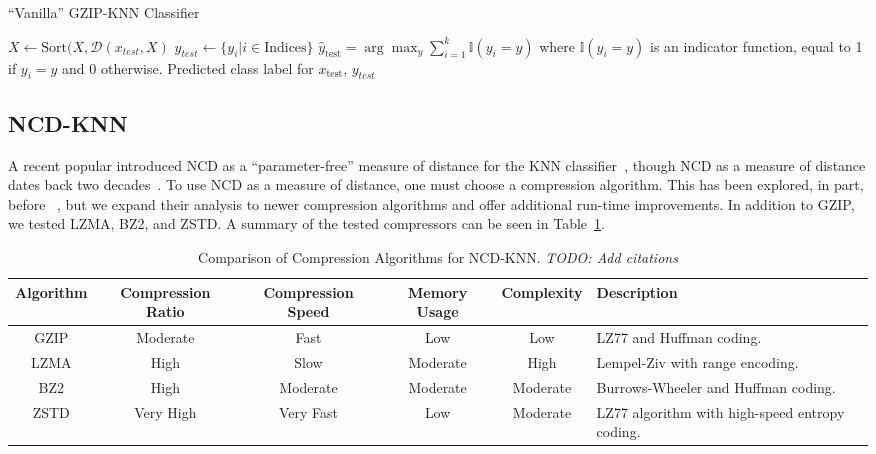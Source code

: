\documentclass[conference]{IEEEtran}
\newcommand{\cm}[1]{\textit{{\color{blue}#1}}}
\begin{document}
\begin{algorithm}
    \caption{``Vanilla'' GZIP-KNN Classifier}
    \label{alg:knn}
    \label{alg:vanilla}
    \begin{algorithmic}
    \State $ X \leftarrow \textrm{Sort}(X, \mathcal{D}(x_{test}, X)
    $
    \State $y_{test} \leftarrow \{y_i | i \in \textrm{Indices}\}$
    \State $\hat{y}_{\text{test}} = \arg\max_y \sum_{i=1}^{k} \mathbb{I}(y_i = y)$
    where $\mathbb{I}(y_i = y)$ is an indicator function, equal to 1 if $y_i = y$ and 0 otherwise.
    \State \Return Predicted class label for $x_{\text{test}}$, $y_{test}$
    
    \end{algorithmic}
    
\end{algorithm}


\subsection{NCD-KNN}
\label{ncd-knn}

A recent popular introduced NCD as a ``parameter-free'' measure of distance for the KNN classifier~\cite{jiang2022less}, though NCD as a measure of distance dates back two decades~\cite{ncd}. 
To use NCD as a measure of distance, one must choose a compression algorithm. This has been explored, in part, before ~\cite{ncd_pitfalls}, but we expand their analysis to newer compression algorithms and offer additional run-time improvements.
In addition to GZIP, we tested LZMA, BZ2, and ZSTD. A summary of the tested compressors can be seen in Table~\ref{tab:compression_algorithms}.

\begin{table}[h]
    \centering
    \caption{Comparison of Compression Algorithms for NCD-KNN. \cm{TODO: Add citations}}
    \begin{tabular}{|c|c|c|c|c|l|}
        \hline
        \textbf{Algorithm} & \textbf{Compression Ratio} & \textbf{Compression Speed} & \textbf{Memory Usage} & \textbf{Complexity} & \textbf{Description} \\ \hline
        GZIP  & Moderate & Fast & Low  & Low & LZ77 and Huffman coding. \\ \hline
        LZMA  & High     & Slow & Moderate & High & Lempel-Ziv with range encoding. \\ \hline
        BZ2   & High     & Moderate & Moderate & Moderate & Burrows-Wheeler and Huffman coding. \\ \hline
        ZSTD  & Very High & Very Fast & Low & Moderate & LZ77 algorithm with high-speed entropy coding. \\ \hline
    \end{tabular}
    \label{tab:compression_algorithms}
\end{table}
\end{document}

